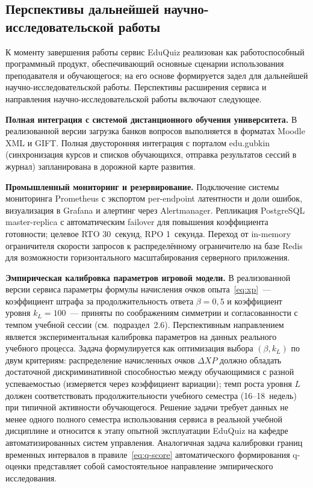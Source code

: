 \subsection{Перспективы дальнейшей научно-исследовательской работы}
\label{sec:future-work}

К моменту завершения работы сервис EduQuiz реализован как
работоспособный программный продукт, обеспечивающий основные
сценарии использования преподавателя и обучающегося; на его
основе формируется задел для дальнейшей научно-исследовательской
работы. Перспективы расширения сервиса и направления
научно-исследовательской работы включают следующее.

\textbf{Полная интеграция с системой дистанционного обучения
университета.} В реализованной версии загрузка банков вопросов
выполняется в форматах Moodle XML и GIFT. Полная двусторонняя
интеграция с порталом edu.gubkin (синхронизация курсов и списков
обучающихся, отправка результатов сессий в журнал) запланирована
в дорожной карте развития.

\textbf{Промышленный мониторинг и резервирование.} Подключение
системы мониторинга Prometheus с экспортом per-endpoint латентности
и доли ошибок, визуализация в Grafana и алертинг через Alertmanager.
Репликация PostgreSQL master-replica с автоматическим failover
для повышения коэффициента готовности; целевое RTO 30~секунд,
RPO 1~секунда. Переход от in-memory ограничителя скорости запросов
к распределённому ограничителю на базе Redis для возможности
горизонтального масштабирования серверного приложения.

\textbf{Эмпирическая калибровка параметров игровой модели.}
В реализованной версии сервиса параметры формулы начисления
очков опыта~\eqref{eq:xp}~--- коэффициент штрафа за продолжительность
ответа $\beta = 0{,}5$ и коэффициент уровня $k_L = 100$~--- приняты
по соображениям симметрии и согласованности с темпом учебной
сессии (см.~подраздел~2.6). Перспективным направлением является
экспериментальная калибровка параметров на данных реального
учебного процесса. Задача формулируется как оптимизация выбора
$(\beta, k_L)$ по двум критериям: распределение начисленных
очков $\Delta XP$ должно обладать достаточной дискриминативной
способностью между обучающимися с разной успеваемостью
(измеряется через коэффициент вариации); темп роста уровня $L$
должен соответствовать продолжительности учебного семестра
(16--18~недель) при типичной активности обучающегося. Решение
задачи требует данных не менее одного полного семестра
использования сервиса в реальной учебной дисциплине и относится
к этапу опытной эксплуатации EduQuiz на кафедре автоматизированных
систем управления. Аналогичная задача калибровки границ временных
интервалов в правиле~\eqref{eq:q-score} автоматического формирования
q-оценки представляет собой самостоятельное направление
эмпирического исследования.

